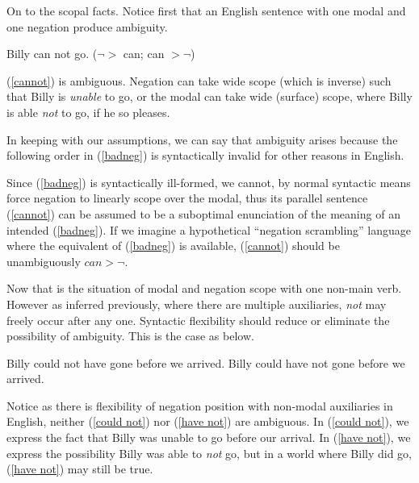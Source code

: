 \documentclass{article}
\begin{document}
On to the scopal facts. Notice first that an English sentence with one modal and one negation produce ambiguity.

\begin{exe}
\ex Billy can not go. \label{cannot}\hfill ($\neg >$ can; can $> \neg$) 
\end{exe}

(\ref{cannot}) is ambiguous. Negation can take wide scope (which is inverse) such that Billy is \emph{unable} to go, or the modal can take wide (surface) scope, where Billy is able \emph{not} to go, if he so pleases.

In keeping with our assumptions, we can say that ambiguity arises because the following order in (\ref{badneg}) is syntactically invalid for other reasons in English.

\begin{exe}
\end{exe}

Since (\ref{badneg}) is syntactically ill-formed, we cannot, by normal syntactic means force negation to linearly scope over the modal, thus its parallel sentence (\ref{cannot}) can be assumed to be a suboptimal enunciation of the meaning of an intended (\ref{badneg}). If we imagine a hypothetical ``negation scrambling'' language where the equivalent of (\ref{badneg}) is available, (\ref{cannot}) should be unambiguously $can > \neg$.

Now that is the situation of modal and negation scope with one non-main verb. However as inferred previously, where there are multiple auxiliaries, \emph{not} may freely occur after any one. Syntactic flexibility should reduce or eliminate the possibility of ambiguity. This is the case as below.

\begin{exe}
\ex Billy could not have gone before we arrived.\label{could not}
\ex Billy could have not gone before we arrived.\label{have not}
\end{exe}

Notice as there is flexibility of negation position with non-modal auxiliaries in English, neither (\ref{could not}) nor (\ref{have not}) are ambiguous. In (\ref{could not}), we express the fact that Billy was unable to go before our arrival. In (\ref{have not}), we express the possibility Billy was able to \emph{not} go, but in a world where Billy did go, (\ref{have not}) may still be true.

\end{document}
